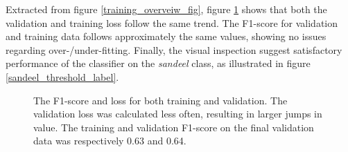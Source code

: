         
        Extracted from figure \ref{training_overveiw_fig}, figure \ref{loss_f1_duo_plot_fig} shows that both the validation and training loss follow the same trend. The F1-score for validation and training data follows approximately the same values, showing no issues regarding over-/under-fitting. Finally, the visual inspection suggest satisfactory performance of the classifier on the \textit{sandeel} class, as illustrated in figure \ref{sandeel_threshold_label}.%
        
        \clearpage
        \begin{figure}[H]
            \centering
            \qquad
            \caption[Loss and F1 score during training]{The F1-score and loss for both training and validation. The validation loss was calculated less often, resulting in larger jumps in value. The training and validation F1-score on the final validation data was respectively 0.63 and 0.64.}%
            \label{loss_f1_duo_plot_fig}%
        \end{figure}
            
